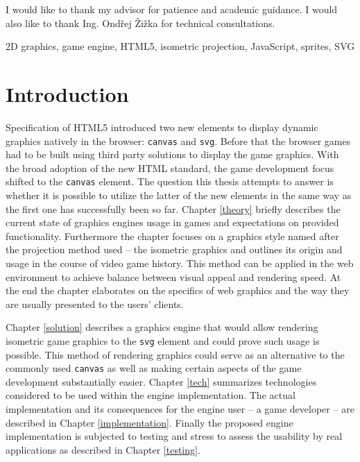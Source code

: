 \documentclass[11pt,oneside, final]{fithesis2}
\begin{document}
  
\FrontMatter  
\ThesisTitlePage  
 
\begin{ThesisDeclaration}  
\DeclarationText  
\AdvisorName  
\end{ThesisDeclaration}  
 
\begin{ThesisThanks}  
I would like to thank my advisor for patience and academic guidance. I would also like to thank Ing. Ondřej Žižka for technical consultations.
\end{ThesisThanks}  
 
\begin{ThesisAbstract}  

\end{ThesisAbstract}  
 
\begin{ThesisKeyWords}  
2D graphics, game engine, HTML5, isometric projection, JavaScript, sprites, SVG
\end{ThesisKeyWords}  
 
\MainMatter
 
\tableofcontents          %
 
\chapter{Introduction}
Specification of HTML5 introduced two new elements to display dynamic graphics natively in the browser: \texttt{canvas} and \texttt{svg}\cite{w3_html5}. Before that the browser games had to be built using third party solutions to display the game graphics\cite{pagella}. With the broad adoption of the new HTML standard, the game development focus shifted to the \texttt{canvas} element\cite{pagella}. The question this thesis attempts to answer is whether it is possible to utilize the latter of the new elements in the same way as the first one has successfully been so far. Chapter \ref{theory} briefly describes the current state of graphics engines usage in games and expectations on provided functionality. Furthermore the chapter focuses on a graphics style named after the projection method used -- the isometric graphics and outlines its origin and usage in the course of video game history. This method can be applied in the web environment to achieve balance between visual appeal and rendering speed. At the end the chapter elaborates on the specifics of web graphics and the way they are usually presented to the users' clients.

Chapter \ref{solution} describes a graphics engine that would allow rendering isometric game graphics to the \texttt{svg} element and could prove such usage is possible. This method of rendering graphics could serve as an alternative to the commonly used \texttt{canvas} as well as making certain aspects of the game development substantially easier. Chapter \ref{tech} summarizes technologies considered to be used within the engine implementation. The actual implementation and its consequences for the engine user -- a game developer -- are described in Chapter \ref{implementation}. Finally the proposed engine implementation is subjected to testing and stress to assess the usability by real applications as described in Chapter \ref{testing}.
\end{document}
